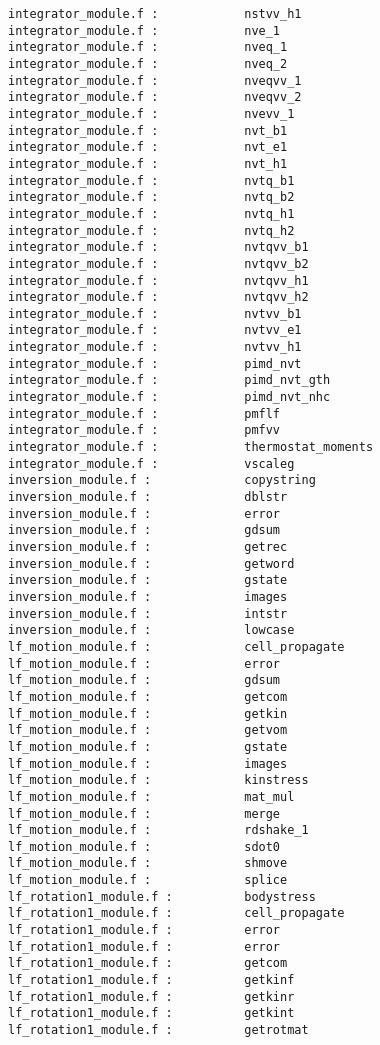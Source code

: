 \begin{verbatim}
integrator_module.f :            nstvv_h1 
integrator_module.f :            nve_1 
integrator_module.f :            nveq_1 
integrator_module.f :            nveq_2 
integrator_module.f :            nveqvv_1 
integrator_module.f :            nveqvv_2 
integrator_module.f :            nvevv_1 
integrator_module.f :            nvt_b1 
integrator_module.f :            nvt_e1 
integrator_module.f :            nvt_h1 
integrator_module.f :            nvtq_b1 
integrator_module.f :            nvtq_b2 
integrator_module.f :            nvtq_h1 
integrator_module.f :            nvtq_h2 
integrator_module.f :            nvtqvv_b1 
integrator_module.f :            nvtqvv_b2 
integrator_module.f :            nvtqvv_h1 
integrator_module.f :            nvtqvv_h2 
integrator_module.f :            nvtvv_b1 
integrator_module.f :            nvtvv_e1 
integrator_module.f :            nvtvv_h1 
integrator_module.f :            pimd_nvt 
integrator_module.f :            pimd_nvt_gth 
integrator_module.f :            pimd_nvt_nhc 
integrator_module.f :            pmflf 
integrator_module.f :            pmfvv 
integrator_module.f :            thermostat_moments 
integrator_module.f :            vscaleg 
inversion_module.f :             copystring 
inversion_module.f :             dblstr
inversion_module.f :             error 
inversion_module.f :             gdsum 
inversion_module.f :             getrec 
inversion_module.f :             getword 
inversion_module.f :             gstate 
inversion_module.f :             images 
inversion_module.f :             intstr
inversion_module.f :             lowcase 
lf_motion_module.f :             cell_propagate 
lf_motion_module.f :             error 
lf_motion_module.f :             gdsum 
lf_motion_module.f :             getcom 
lf_motion_module.f :             getkin
lf_motion_module.f :             getvom 
lf_motion_module.f :             gstate 
lf_motion_module.f :             images 
lf_motion_module.f :             kinstress 
lf_motion_module.f :             mat_mul 
lf_motion_module.f :             merge 
lf_motion_module.f :             rdshake_1 
lf_motion_module.f :             sdot0
lf_motion_module.f :             shmove 
lf_motion_module.f :             splice 
lf_rotation1_module.f :          bodystress 
lf_rotation1_module.f :          cell_propagate 
lf_rotation1_module.f :          error 
lf_rotation1_module.f :          error 
lf_rotation1_module.f :          getcom 
lf_rotation1_module.f :          getkinf
lf_rotation1_module.f :          getkinr
lf_rotation1_module.f :          getkint
lf_rotation1_module.f :          getrotmat 

\end{verbatim}
